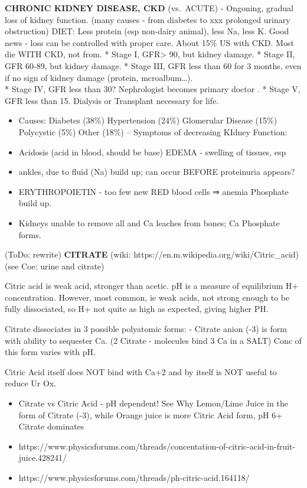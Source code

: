 \textbf{CHRONIC KIDNEY DISEASE, CKD} (vs.~ACUTE) - Ongoning, gradual
loss of kidney function. (many causes - from diabetes to xxx prolonged
urinary obstruction) DIET: Less protein (esp non-dairy animal), less Na,
less K. Good news - loss can be controlled with proper care. About 15\%
US with CKD. Most die WITH CKD, not from. * Stage I, GFR\textgreater{}
90, but kidney damage. * Stage II, GFR 60-89, but kidney damage. * Stage
III, GFR less than 60 for 3 months, even if no sign of kidney damage
(protein, mcroalbum\ldots).\\
* Stage IV, GFR less than 30? Nephrologist becomes primary doctor . *
Stage V, GFR less than 15. Dialysis or Transplant necessary for life.

\begin{itemize}
\item
  Causes: Diabetes (38\%) \textbar{} Hypertension (24\%) \textbar{}
  Glomerular Disease (15\%) \textbar{} Polycystic (5\%) \textbar{} Other
  (18\%) -- Symptoms of decreasing KIdney Function:
\item
  Acidosis (acid in blood, should be base) EDEMA - swelling of tissues,
  esp
\item
  ankles, due to fluid (Na) build up; can occur BEFORE proteinuria
  appears?
\item
  ERYTHROPOIETIN - too few new RED blood cells ⇒ anemia Phosphate build
  up.
\item
  Kidneys unable to remove all and Ca leaches from bones; Ca Phosphate
  forms.
\end{itemize}

(ToDo: rewrite) \textbf{CITRATE} (wiki:
https://en.m.wikipedia.org/wiki/Citric\_acid) (see Coe: urine and
citrate)

Citric acid is weak acid, stronger than acetic. pH is a measure of
equilibrium H+ concentration. However, most common, ie weak acids, not
strong enough to be fully dissociated, so H+ not quite as high as
expected, giving higher PH.

Citrate dissociates in 3 possible polyatomic forms: - Citrate anion (-3)
is form with ability to sequester Ca. (2 Citrate - molecules bind 3 Ca
in a SALT) Conc of this form varies with pH.

Citric Acid itself does NOT bind with Ca+2 and by itself is NOT useful
to reduce Ur Ox.

\begin{itemize}
\item
  Citrate vs Citric Acid - pH dependent! See Why Lemon/Lime Juice in the
  form of Citrate (-3), while Orange juice is more Citric Acid form, pH
  6+ Citrate dominates
\item
  https://www.physicsforums.com/threads/concentation-of-citric-acid-in-fruit-juice.428241/
\item
  https://www.physicsforums.com/threads/ph-citric-acid.164118/
\end{itemize}

